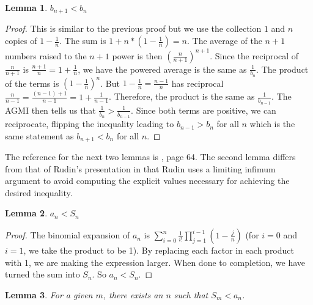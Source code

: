 \documentclass[12pt]{article}
\newtheorem{lemma}{Lemma}[subsection]
\begin{document}
\begin{lemma}
 $b_{n+1} < b_n$
\end{lemma}

\begin{proof}
This is similar to the previous proof but we use the collection $1$ and $n$ copies of $1 - \frac{1}{n}$. The sum is $1 + n*(1-\frac{1}{n}) = n$. The average of the $n+1$ numbers raised to the $n+1$ power is then $(\frac{n}{n+1})^{n+1}$. Since the reciprocal of $\frac{n}{n+1}$ is $\frac{n+1}{n} = 1+\frac{1}{n}$, we have the powered average is the same as $\frac{1}{b_n}$. The product of the terms is $(1-\frac{1}{n})^n$. But $1 - \frac{1}{n} = \frac{n-1}{n}$ has reciprocal $\frac{n}{n-1} = \frac{ (n-1) + 1}{n-1} = 1 + \frac{1}{n-1}$. Therefore, the product is the same as $\frac{1}{b_{n-1}}$. The AGMI then tells us that $\frac{1}{b_n} > \frac{1}{b_{n-1}}$. Since both terms are positive, we can reciprocate, flipping the inequality leading to $b_{n-1} > b_n$ for all $n$ which is the same statement as $b_{n+1} < b_n$ for all $n$. 
\end{proof}

The reference for the next two lemmas is \cite{rudin}, page 64. The second lemma differs from that of Rudin's presentation in that Rudin uses a limiting infimum argument to avoid computing the explicit values necessary for achieving the desired inequality. 

\begin{lemma}\label{lem:ansn}
$a_n < S_n$
\end{lemma}

\begin{proof}
The binomial expansion of $a_n$ is $\sum_{i=0}^n \frac{1}{i!} \prod_{j=1}^{i-1} (1-\tfrac{j}{n})$ (for $i=0$ and $i=1$, we take the product to be 1). By replacing each factor in each product with 1, we are making the expression larger. When done to completion, we have turned the sum into $S_n$. So $a_n < S_n$.
\end{proof}

\begin{lemma}\label{lem:snam}
For a given $m$, there exists an $n$ such that $S_m < a_n$.   
\end{lemma}
\end{document}
